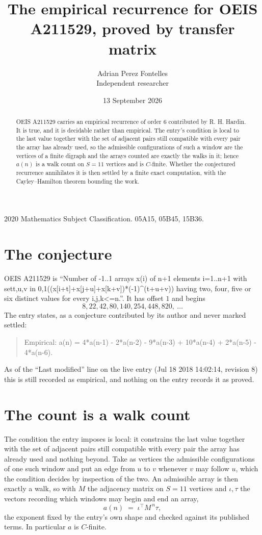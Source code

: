 \documentclass[11pt,a4paper]{article}
\title{The empirical recurrence for OEIS A211529, proved by transfer matrix}
\author{Adrian Perez Fontelles\\ \small Independent researcher}
\date{13 September 2026}
\theoremstyle{plain}
\theoremstyle{definition}
\begin{document}
\maketitle

\begin{abstract}
OEIS A211529 carries an empirical recurrence of order $6$ contributed by R. H. Hardin. It is
true, and it is decidable rather than empirical. The entry's condition is local to the last value together with the set of adjacent pairs still compatible with every pair the array has already used, so
the admissible configurations of such a window are the vertices of a finite digraph and the
arrays counted are exactly the walks in it; hence $a(n)$ is a walk count on $S=11$ vertices
and is $C$-finite. Whether the conjectured recurrence annihilates it is then settled by a
finite exact computation, with the Cayley--Hamilton theorem bounding the work.
\end{abstract}

\noindent\small 2020 Mathematics Subject Classification. 05A15, 05B45, 15B36.\normalsize

\section{The conjecture}

OEIS A211529 is ``Number of -1..1 arrays x(i) of n+1 elements i=1..n+1 with set{t,u,v in 0,1}((x[i+t]+x[j+u]+x[k+v])*(-1)\^{}(t+u+v)) having two, four, five or six distinct values for every i,j,k<=n.''. It has offset $1$ and begins
\[
8, 22, 42, 80, 140, 254, 448, 820,\ \dots
\]
The entry states, as a conjecture contributed by its author and never marked settled:
\begin{quote}
Empirical: a(n) = 4*a(n-1) - 2*a(n-2) - 9*a(n-3) + 10*a(n-4) + 2*a(n-5) - 4*a(n-6).
\end{quote}
As of the ``Last modified'' line on the live entry (Jul 18 2018 14:02:14, revision 8) this is still
recorded as empirical, and nothing on the entry records it as proved.

\section{The count is a walk count}

The condition the entry imposes is local: it constrains the last value together with the set of adjacent pairs still compatible with every pair the array has already used and nothing beyond. Take as
vertices the admissible configurations of one such window and put an edge from $u$ to $v$
whenever $v$ may follow $u$, which the condition decides by inspection of the two. An
admissible array is then exactly a walk, so with $M$ the adjacency matrix on $S=11$ vertices
and $\iota,\tau$ the vectors recording which windows may begin and end an array,
\[
a(n)\;=\;\iota^{\!\top}M^{\,n}\tau ,
\]
the exponent fixed by the entry's own shape and checked against its published terms. In
particular $a$ is $C$-finite.
\end{document}
